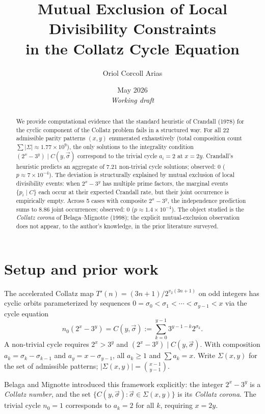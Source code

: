 \documentclass[11pt,a4paper]{article}
\title{Mutual Exclusion of Local Divisibility Constraints \\ in the Collatz Cycle Equation}
\author{Oriol Corcoll Arias}
\date{May 2026 \\ \emph{Working draft}}
\theoremstyle{plain}
\theoremstyle{definition}
\begin{document}
\maketitle

\begin{abstract}
We provide computational evidence that the standard heuristic of Crandall (1978) for the cyclic component of the Collatz problem fails in a structured way. For all 22 admissible parity patterns $(x, y)$ enumerated exhaustively (total composition count $\sum |\Sigma| \approx 1.77 \times 10^9$), the only solutions to the integrality condition $(2^x - 3^y) \mid C(y, \vec\sigma)$ correspond to the trivial cycle $a_i = 2$ at $x = 2y$. Crandall's heuristic predicts an aggregate of $7.21$ non-trivial cycle solutions; observed: $0$ ($p \approx 7 \times 10^{-4}$). The deviation is structurally explained by mutual exclusion of local divisibility events: when $2^x - 3^y$ has multiple prime factors, the marginal events $\{p_i \mid C\}$ each occur at their expected Crandall rate, but their joint occurrence is empirically empty. Across 5 cases with composite $2^x - 3^y$, the independence prediction sums to $8.86$ joint occurrences; observed: $0$ ($p \approx 1.4 \times 10^{-4}$). The object studied is the \emph{Collatz corona} of Belaga--Mignotte (1998); the explicit mutual-exclusion observation does not appear, to the author's knowledge, in the prior literature surveyed.
\end{abstract}

\section{Setup and prior work}

The accelerated Collatz map $T'(n) = (3n+1)/2^{v_2(3n+1)}$ on odd integers has cyclic orbits parameterized by sequences $0 = \sigma_0 < \sigma_1 < \cdots < \sigma_{y-1} < x$ via the cycle equation \cite{lagarias1985}
\begin{equation}\label{eq:cycle}
n_0 (2^x - 3^y) = C(y, \vec\sigma) := \sum_{k=0}^{y-1} 3^{y-1-k} 2^{\sigma_k}.
\end{equation}
A non-trivial cycle requires $2^x > 3^y$ and $(2^x - 3^y) \mid C(y, \vec\sigma)$. With composition $a_k = \sigma_k - \sigma_{k-1}$ and $a_y = x - \sigma_{y-1}$, all $a_k \ge 1$ and $\sum a_k = x$. Write $\Sigma(x, y)$ for the set of admissible patterns; $|\Sigma(x, y)| = \binom{x-1}{y-1}$.

Belaga and Mignotte \cite{belaga1998} introduced this framework explicitly: the integer $2^x - 3^y$ is a \emph{Collatz number}, and the set $\{C(y, \vec\sigma) : \vec\sigma \in \Sigma(x, y)\}$ is its \emph{Collatz corona}. The trivial cycle $n_0 = 1$ corresponds to $a_k = 2$ for all $k$, requiring $x = 2y$.
\end{document}
